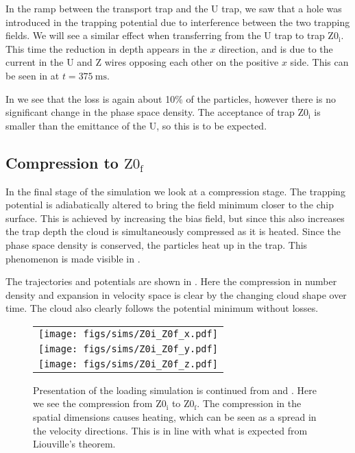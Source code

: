 In the ramp between the transport trap and the U trap, we saw that a hole was
introduced in the trapping potential due to interference between the two
trapping fields. We will see a similar effect when transferring from the U trap
to trap $\mathrm{Z0_i}$.  This time the reduction in depth appears in the $x$
direction, and is due to the current in the U and Z wires opposing each other
on the positive $x$ side. This can be seen in  at
$t=\SI{375}{\milli\second}$.

In  we see that the loss is again about 10\% of
the particles, however there is no significant change in the phase space
density. The acceptance of trap $\mathrm{Z0_i}$ is smaller than the emittance
of the U, so this is to be expected.

\subsection{Compression to $\mathrm{Z0_f}$}

In the final stage of the simulation we look at a compression stage. The
trapping potential is adiabatically altered to bring the field minimum closer
to the chip surface. This is achieved by increasing the bias field, but since
this also increases the trap depth the cloud is simultaneously compressed as it
is heated. Since the phase space density is conserved, the particles heat up in
the trap. This phenomenon is made visible in
.

The trajectories and potentials are shown in .
Here the compression in number density and expansion in velocity space is clear
by the changing cloud shape over time. The cloud also clearly follows the
potential minimum without losses.

%
\begin{figure}[p]
\centering
  \begin{tabular}{c}
    \texttt{[image: figs/sims/Z0i\_Z0f\_x.pdf]} \\
    \texttt{[image: figs/sims/Z0i\_Z0f\_y.pdf]} \\
    \texttt{[image: figs/sims/Z0i\_Z0f\_z.pdf]}
  \end{tabular}
  \caption{Presentation of the loading simulation is continued from
   and . Here we see
  the compression from $\mathrm{Z0_i}$ to $\mathrm{Z0_f}$. The compression in
  the spatial dimensions causes heating, which can be seen as a spread in the
  velocity directions. This is in line with what is expected from Liouville's
  theorem.
  }
  \label{design:fig:Z0i_Z0f}
\end{figure}

